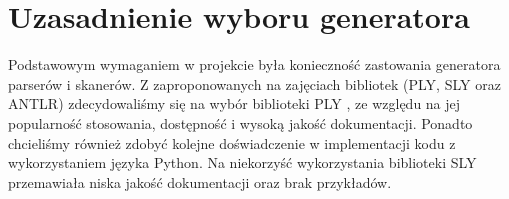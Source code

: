 \chapter{Uzasadnienie wyboru generatora}

Podstawowym wymaganiem w projekcie była konieczność zastowania generatora parserów i skanerów. Z zaproponowanych na zajęciach bibliotek
(PLY, SLY oraz ANTLR) zdecydowaliśmy się na wybór biblioteki PLY \cite{ply}, ze względu na jej popularność 
stosowania, dostępność i wysoką jakość dokumentacji. Ponadto chcieliśmy również zdobyć kolejne doświadczenie w implementacji kodu z wykorzystaniem
języka Python. Na niekorzyść wykorzystania biblioteki SLY przemawiała niska jakość dokumentacji oraz brak przykładów. 